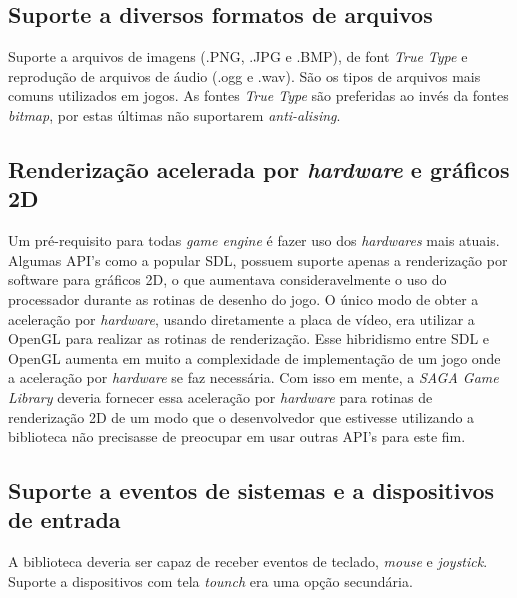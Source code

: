 \subsection{Suporte a diversos formatos de arquivos}
%
Suporte a arquivos de imagens (.PNG, .JPG e .BMP), de font \textit{True Type} e reprodução de arquivos de áudio (.ogg e .wav). São os tipos de arquivos mais comuns utilizados em jogos. As fontes \textit{True Type} são preferidas ao invés da fontes \textit{bitmap}, por estas últimas não suportarem \textit{anti-alising}. 
%
\subsection{Renderização acelerada por \textit{hardware} e gráficos 2D}
%
Um pré-requisito para todas \textit{game engine} é fazer uso dos \textit{hardwares} mais atuais. Algumas API's como a popular SDL, possuem suporte apenas a renderização por software para gráficos 2D, o que aumentava consideravelmente o uso do processador durante as rotinas de desenho do jogo. O único modo de obter a aceleração por \textit{hardware}, usando diretamente a placa de vídeo, era utilizar a OpenGL para realizar as rotinas de renderização. Esse hibridismo entre SDL e OpenGL aumenta em muito a complexidade de implementação de um jogo onde a aceleração por \textit{hardware} se faz necessária. Com isso em mente, a \textit{SAGA Game Library} deveria fornecer essa aceleração por \textit{hardware}
para rotinas de renderização 2D de um modo que o desenvolvedor que estivesse utilizando a biblioteca não precisasse de preocupar em usar outras API's para este fim.
%
\subsection{Suporte a eventos de sistemas e a dispositivos de entrada}
%
A biblioteca deveria ser capaz de receber eventos de teclado, \textit{mouse} e \textit{joystick}. Suporte a dispositivos com tela \textit{tounch} era uma opção secundária.
%
